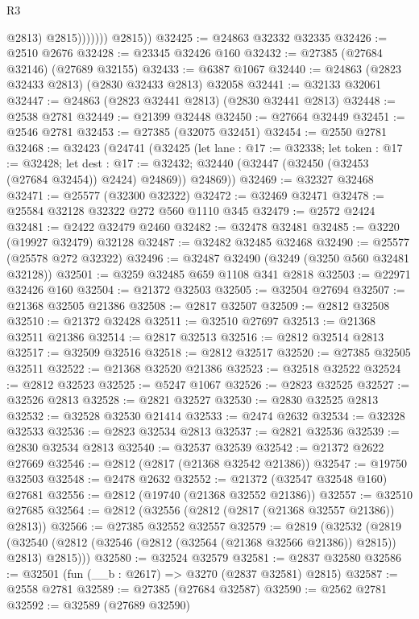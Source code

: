 \begin{lexlean}{R3}
\begin{coremodule}
                        @2813)
                      @2815)))))))
        @2815))
@32425 := @24863 @32332 @32335
@32426 := @2510 @2676
@32428 := @23345 @32426 @160
@32432 := @27385 (@27684 @32146) (@27689 @32155)
@32433 := @6387 @1067
@32440 := @24863 (@2823 @32433 @2813) (@2830 @32433 @2813) @32058
@32441 := @32133 @32061
@32447 := @24863 (@2823 @32441 @2813) (@2830 @32441 @2813)
@32448 := @2538 @2781
@32449 := @21399 @32448
@32450 := @27664 @32449
@32451 := @2546 @2781
@32453 := @27385 (@32075 @32451)
@32454 := @2550 @2781
@32468 := @32423
    (@24741
      (@32425
        (let lane : @17 := @32338;
        let token : @17 := @32428;
        let dest : @17 := @32432; @32440 (@32447 (@32450 (@32453 (@27684 @32454)) @2424) @24869))
        @24869))
@32469 := @32327 @32468
@32471 := @25577 (@32300 @32322)
@32472 := @32469 @32471
@32478 := @25584 @32128 @32322 @272 @560 @1110 @345
@32479 := @2572 @2424
@32481 := @2422 @32479 @2460
@32482 := @32478 @32481
@32485 := @3220 (@19927 @32479) @32128
@32487 := @32482 @32485 @32468
@32490 := @25577 (@25578 @272 @32322)
@32496 := @32487 @32490 (@3249 (@3250 @560 @32481 @32128))
@32501 := @3259 @32485 @659 @1108 @341 @2818
@32503 := @22971 @32426 @160
@32504 := @21372 @32503
@32505 := @32504 @27694
@32507 := @21368 @32505 @21386
@32508 := @2817 @32507
@32509 := @2812 @32508
@32510 := @21372 @32428
@32511 := @32510 @27697
@32513 := @21368 @32511 @21386
@32514 := @2817 @32513
@32516 := @2812 @32514 @2813
@32517 := @32509 @32516
@32518 := @2812 @32517
@32520 := @27385 @32505 @32511
@32522 := @21368 @32520 @21386
@32523 := @32518 @32522
@32524 := @2812 @32523
@32525 := @5247 @1067
@32526 := @2823 @32525
@32527 := @32526 @2813
@32528 := @2821 @32527
@32530 := @2830 @32525 @2813
@32532 := @32528 @32530 @21414
@32533 := @2474 @2632
@32534 := @32328 @32533
@32536 := @2823 @32534 @2813
@32537 := @2821 @32536
@32539 := @2830 @32534 @2813
@32540 := @32537 @32539
@32542 := @21372 @2622 @27669
@32546 := @2812 (@2817 (@21368 @32542 @21386))
@32547 := @19750 @32503
@32548 := @2478 @2632
@32552 := @21372 (@32547 @32548 @160) @27681
@32556 := @2812 (@19740 (@21368 @32552 @21386))
@32557 := @32510 @27685
@32564 := @2812 (@32556 (@2812 (@2817 (@21368 @32557 @21386)) @2813))
@32566 := @27385 @32552 @32557
@32579 := @2819
    (@32532
      (@2819 (@32540 (@2812 (@32546 (@2812 (@32564 (@21368 @32566 @21386)) @2815)) @2813) @2815)))
@32580 := @32524 @32579
@32581 := @2837 @32580
@32586 := @32501 (fun (__b : @2617) => @3270 (@2837 @32581) @2815)
@32587 := @2558 @2781
@32589 := @27385 (@27684 @32587)
@32590 := @2562 @2781
@32592 := @32589 (@27689 @32590)

\end{coremodule}
\end{lexlean}
